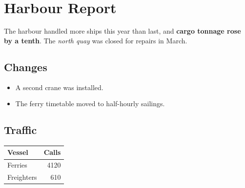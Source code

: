\documentclass{article}
\begin{document}
\section*{Harbour Report}

The harbour handled more ships this year than last, and \textbf{cargo tonnage rose
by a tenth}. The \textit{north quay} was closed for repairs in March.

\subsection*{Changes}

\begin{itemize}
\item A second crane was installed.
\item The ferry timetable moved to half-hourly sailings.
\end{itemize}

\subsection*{Traffic}

\begin{tabular}{|l|r|}
\hline
Vessel & Calls \\
\hline
Ferries & 4120 \\
\hline
Freighters & 610 \\
\hline
\end{tabular}
\end{document}
